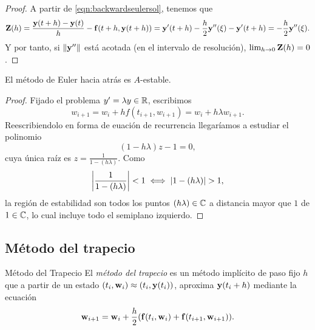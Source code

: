 \begin{proof}
    A partir de \eqref{eqn:backwardseulersol}, tenemos que 
    \begin{equation*}
        \vb{Z}{}(h) =
        \frac{\vb{y}{}(t + h) - \vb{y}{}(t)}{h} - \vb{f}{}(t+h, \vb{y}{}(t+h)) =
        \vb{y}{}'(t + h) - \frac{h}{2}\vb{y}{}''(\xi) - \vb{y}{}'(t+h) =
        - \frac{h}{2}\vb{y}{}''(\xi).
    \end{equation*}
    Y por tanto, si $\norm{\vb{y}{}''}$ está acotada (en el intervalo de resolución),
    $\lim_{h \to 0} \vb{Z}{}(h) = 0$.
\end{proof}


\begin{proposition}
    El método de Euler hacia atrás es $A$-estable.
\end{proposition}

\begin{proof}
    Fijado el problema $y' = \lambda y \in \mathbb{R}$, escribimos
    \begin{equation*}
        w_{i+1} = w_i + hf(t_{i+1}, w_{i+1}) = w_i + h\lambda w_{i+1}.
    \end{equation*}
    Reescribiendolo en forma de euación de recurrencia
    llegaríamos a estudiar el polinomio
    \begin{equation*}
        (1 - h\lambda)z - 1 = 0,
    \end{equation*}
    cuya única raíz es $z = \frac{1}{1 - (h\lambda)}$.
    Como
    \begin{equation*}
        \abs{\frac{1}{1 - (h\lambda)}} < 1 \iff
        \abs{1 - (h\lambda)} > 1,
    \end{equation*}
    la región de estabilidad son todos los puntos $(h\lambda) \in \mathbb{C}$
    a distancia mayor que $1$ de $1 \in \mathbb{C}$,
    lo cual incluye todo el semiplano izquierdo.
\end{proof}

\subsection{Método del trapecio}

\begin{method}{Método del Trapecio}
    El \emph{método del trapecio}
    es un método implícito de paso fijo $h$ que
    a partir de un estado $(t_i, \vb{w}{}_i) \approx (t_i, \vb{y}{}(t_i))$,
    aproxima $\vb{y}{}(t_i + h)$ mediante la ecuación
    \begin{equation}\label{eqn:trapezoidalsol}
        \vb{w}{}_{i+1} = \vb{w}{}_i + \frac{h}{2}\qty(
            \vb{f}{}(t_i, \vb{w}{}_i) + \vb{f}{}(t_{i+1}, \vb{w}{}_{i+1})
        ).
    \end{equation}
\end{method}

